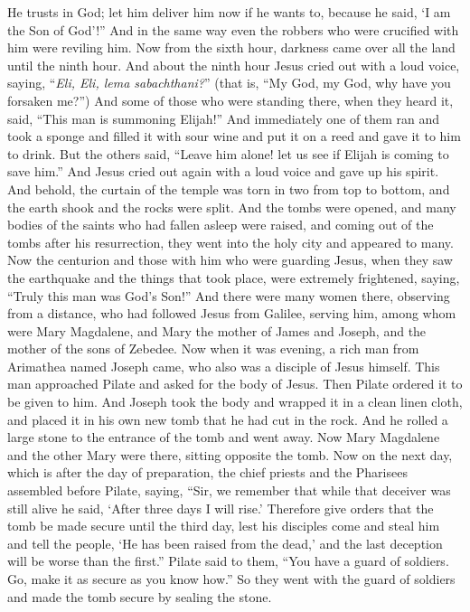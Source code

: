 \begin{biblechapter}
\verse He trusts in God; let him deliver him now if he wants to, because he said, ‘I am the Son of God’!”
\verse And in the same way even the robbers who were crucified with him were reviling him.
 Now from the sixth hour, darkness came over all the land until the ninth hour.
\verse And about the ninth hour Jesus cried out with a loud voice, saying, “\textit{Eli, Eli, lema sabachthani?}” (that is, “My God, my God, why have you forsaken me?”)
\verse And some of those who were standing there, when they heard it, said, “This man is summoning Elijah!”
\verse And immediately one of them ran and took a sponge and filled it with sour wine and put it on a reed and gave it to him to drink.
\verse But the others said, “Leave him alone! let us see if Elijah is coming to save him.”
\verse And Jesus cried out again with a loud voice and gave up his spirit.
\verse And behold, the curtain of the temple was torn in two from top to bottom, and the earth shook and the rocks were split.
\verse And the tombs were opened, and many bodies of the saints who had fallen asleep were raised,
\verse and coming out of the tombs after his resurrection, they went into the holy city and appeared to many.
\verse Now the centurion and those with him who were guarding Jesus, when they saw the earthquake and the things that took place, were extremely frightened, saying, “Truly this man was God’s Son!”
\verse And there were many women there, observing from a distance, who had followed Jesus from Galilee, serving him,
\verse among whom were Mary Magdalene, and Mary the mother of James and Joseph, and the mother of the sons of Zebedee.
 Now when it was evening, a rich man from Arimathea named Joseph came, who also was a disciple of Jesus himself.
\verse This man approached Pilate and asked for the body of Jesus. Then Pilate ordered it to be given to him.
\verse And Joseph took the body and wrapped it in a clean linen cloth,
\verse and placed it in his own new tomb that he had cut in the rock. And he rolled a large stone to the entrance of the tomb and went away.
\verse Now Mary Magdalene and the other Mary were there, sitting opposite the tomb.
 Now on the next day, which is after the day of preparation, the chief priests and the Pharisees assembled before Pilate,
\verse saying, “Sir, we remember that while that deceiver was still alive he said, ‘After three days I will rise.’
\verse Therefore give orders that the tomb be made secure until the third day, lest his disciples come and steal him and tell the people, ‘He has been raised from the dead,’ and the last deception will be worse than the first.”
\verse Pilate said to them, “You have a guard of soldiers. Go, make it as secure as you know how.”
\verse So they went with the guard of soldiers and made the tomb secure by sealing the stone.
\end{biblechapter}

